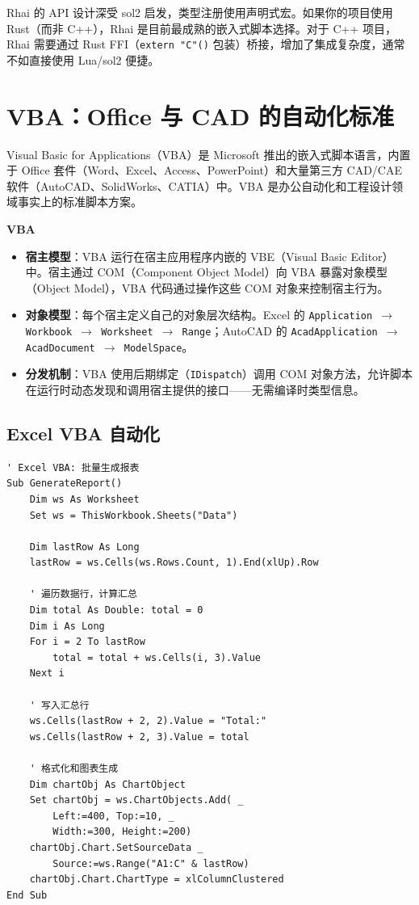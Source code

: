 \documentclass[12pt,a4paper,fontset=fandol]{ctexbook}
\newenvironment{guideline}[1][]{%
  \begin{tcolorbox}[enhanced,breakable,
    colback=blue!5!white,colframe=blue!75!black,
    boxed title style={colback=blue!75!black},
    attach boxed title to top left={yshift=-2mm,xshift=2mm},
    arc=2mm,boxrule=0.8mm,
    title={脚本集成要点},#1]}%
  {\end{tcolorbox}}
\newenvironment{compare}[1][]{%
  \begin{tcolorbox}[enhanced,breakable,
    colback=green!3!white,colframe=green!50!black,
    boxed title style={colback=green!50!black},
    attach boxed title to top left={yshift=-2mm,xshift=2mm},
    arc=2mm,boxrule=0.8mm,
    title={方案对比},#1]}%
  {\end{tcolorbox}}
\newcommand{\Fn}[1]{\texttt{#1()}}
\newcommand{\Tp}[1]{\texttt{#1}}
\newcommand{\vbalabel}{%
  \noindent\begin{tcolorbox}[colback=vbaheadbg,coltext=white,
    sharp corners,boxrule=0pt,width=3.0em,height=1.4em,
    halign=center,valign=center,nobeforeafter,left=0pt,right=0pt,
    top=0pt,bottom=0pt]\small\bfseries VBA\end{tcolorbox}}
\begin{document}
\begin{compare}[title={Rhai 的定位}]
Rhai 的 API 设计深受 sol2 启发，类型注册使用声明式宏。如果你的项目使用 Rust（而非 C++），Rhai 是目前最成熟的嵌入式脚本选择。对于 C++ 项目，Rhai 需要通过 Rust FFI（\Fn{extern "C"} 包装）桥接，增加了集成复杂度，通常不如直接使用 Lua/sol2 便捷。
\end{compare}

\section{VBA：Office 与 CAD 的自动化标准}\label{sec:vba}

Visual Basic for Applications（VBA）是 Microsoft 推出的嵌入式脚本语言，内置于 Office 套件（Word、Excel、Access、PowerPoint）和大量第三方 CAD/CAE 软件（AutoCAD、SolidWorks、CATIA）中。VBA 是办公自动化和工程设计领域事实上的标准脚本方案。

\vbalabel
\begin{guideline}[title={VBA 嵌入架构}]
\begin{itemize}
  \item \textbf{宿主模型}：VBA 运行在宿主应用程序内嵌的 VBE（Visual Basic Editor）中。宿主通过 COM（Component Object Model）向 VBA 暴露对象模型（Object Model），VBA 代码通过操作这些 COM 对象来控制宿主行为。
  \item \textbf{对象模型}：每个宿主定义自己的对象层次结构。Excel 的 \Tp{Application $\to$ Workbook $\to$ Worksheet $\to$ Range}；AutoCAD 的 \Tp{Acad\allowbreak{}Application $\to$ Acad\allowbreak{}Document $\to$ Model\allowbreak{}Space}。
  \item \textbf{分发机制}：VBA 使用后期绑定（\Tp{IDispatch}）调用 COM 对象方法，允许脚本在运行时动态发现和调用宿主提供的接口——无需编译时类型信息。
\end{itemize}
\end{guideline}

\subsection{Excel VBA 自动化}\label{sec:vba-excel}

\begin{lstlisting}[style=csharpstyle]
' Excel VBA: 批量生成报表
Sub GenerateReport()
    Dim ws As Worksheet
    Set ws = ThisWorkbook.Sheets("Data")

    Dim lastRow As Long
    lastRow = ws.Cells(ws.Rows.Count, 1).End(xlUp).Row

    ' 遍历数据行，计算汇总
    Dim total As Double: total = 0
    Dim i As Long
    For i = 2 To lastRow
        total = total + ws.Cells(i, 3).Value
    Next i

    ' 写入汇总行
    ws.Cells(lastRow + 2, 2).Value = "Total:"
    ws.Cells(lastRow + 2, 3).Value = total

    ' 格式化和图表生成
    Dim chartObj As ChartObject
    Set chartObj = ws.ChartObjects.Add( _
        Left:=400, Top:=10, _
        Width:=300, Height:=200)
    chartObj.Chart.SetSourceData _
        Source:=ws.Range("A1:C" & lastRow)
    chartObj.Chart.ChartType = xlColumnClustered
End Sub
\end{lstlisting}
\end{document}
